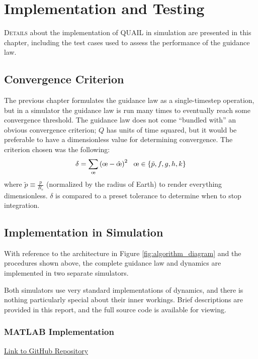 \chapter{Implementation and Testing}

\lettrine{D}{etails} about the implementation of QUAIL in simulation are presented in this chapter, including the test cases used to assess the performance of the guidance law.

\section{Convergence Criterion}
The previous chapter formulates the guidance law as a single-timestep operation, but in a simulator the guidance law is run many times to eventually reach some convergence threshold. The guidance law does not come ``bundled with'' an obvious convergence criterion; \(Q\) has units of time squared, but it would be preferable to have a dimensionless value for determining convergence. The criterion chosen was the following:
\begin{equation*}
  \delta = \sum_\moe \left(\moe-\hat{\moe} \right)^2 \ \ \moe \in \{\tilde{p}, f, g, h, k\}
\end{equation*}
where \(\tilde{p} \equiv \frac{p}{R_e}\) (normalized by the radius of Earth) to render everything dimensionless. \(\delta\) is compared to a preset tolerance to determine when to stop integration.

\section{Implementation in Simulation}
With reference to the architecture in Figure \ref{fig:algorithm_diagram} and the procedures shown above, the complete guidance law and dynamics are implemented in two separate simulators.

Both simulators use very standard implementations of dynamics, and there is nothing particularly special about their inner workings. Brief descriptions are provided in this report, and the full source code is available for viewing.

\subsection{MATLAB Implementation}
\href{https://github.com/itchono/SLyGA}{Link to GitHub Repository}

